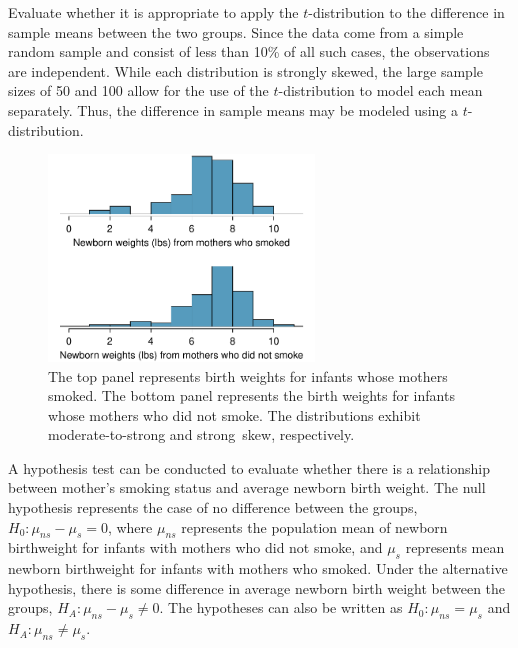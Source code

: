 \begin{example} {Evaluate whether it is appropriate to apply the $t$-distribution to the difference in sample means between the two groups.}
Since the data come from a simple random sample and consist of less than 10\% of all such cases, the observations are independent. While each distribution is strongly skewed, the large sample sizes of 50 and 100 allow for the use of the $t$-distribution to model each mean separately. Thus, the difference in sample means may be modeled using a $t$-distribution.	
\end{example}

\begin{figure}[hhh]
\centering
\includegraphics[width=0.63\textwidth]{ch_inference_for_means_oi_biostat/figures/babySmokePlotOfTwoGroupsToExamineSkew/babySmokePlotOfTwoGroupsToExamineSkew}
\caption{The top panel represents birth weights for infants whose mothers smoked. The bottom panel represents the birth weights for infants whose mothers who did not smoke. The distributions exhibit moderate-to-strong and strong~skew, respectively.}
\label{babySmokePlotOfTwoGroupsToExamineSkew}
\end{figure}

A hypothesis test can be conducted to evaluate whether there is a relationship between mother's smoking status and average newborn birth weight. The null hypothesis represents the case of no difference between the groups, $H_0: \mu_{ns} - \mu_{s} = 0$, where $\mu_{ns}$ represents the population mean of newborn birthweight for infants with mothers who did not smoke, and $\mu_s$ represents mean newborn birthweight for infants with mothers who smoked. Under the alternative hypothesis, there is some difference in average newborn birth weight between the groups, $H_A: \mu_{ns} - \mu_{s} \neq 0$. The hypotheses can also be written as $H_0: \mu_{ns} = \mu_{s}$ and $H_A: \mu_{ns} \neq \mu_{s}$.

